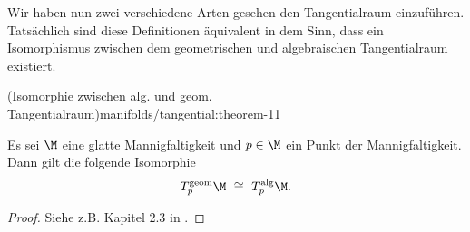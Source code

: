 \documentclass[letterpaper,10pt,german]{jupyterBook}
\begin{document}
\par
Wir haben nun zwei verschiedene Arten gesehen den Tangentialraum einzuführen.
Tatsächlich sind diese Definitionen äquivalent in dem Sinn, dass ein Isomorphismus zwischen dem geometrischen und algebraischen Tangentialraum existiert.
\begin{theorem}{(Isomorphie zwischen alg. und geom. Tangentialraum)}{manifolds/tangential:theorem-11}



\par
Es sei \(\M\) eine glatte Mannigfaltigkeit und \(p\in\M\) ein Punkt der Mannigfaltigkeit.
Dann gilt die folgende Isomorphie
\begin{align*}
T^{\text{geom}}_p\M \ \cong \ T^{\text{alg}}_p\M.
\end{align*}\end{theorem}

\begin{proof}
 Siehe z.B. Kapitel 2.3 in \cite{Janich03}.
\end{proof}
\end{document}
